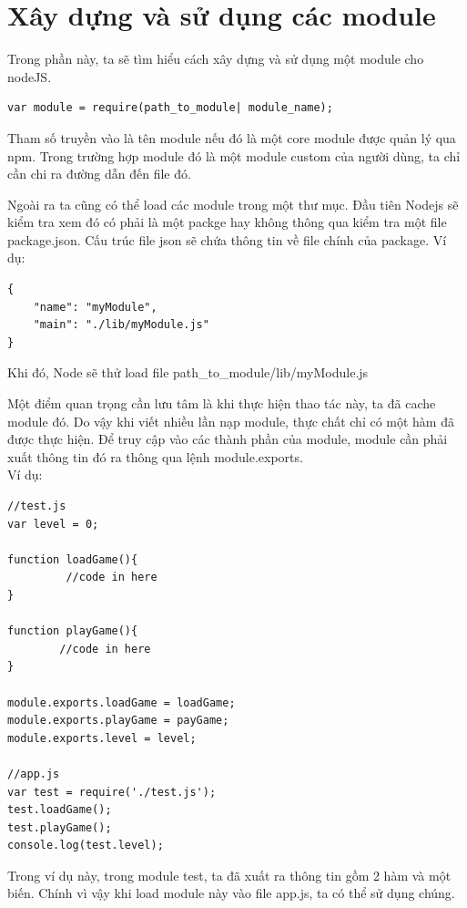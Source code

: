 	\section{Xây dựng và sử dụng các module}
	Trong phần này, ta sẽ tìm hiểu cách xây dựng và sử dụng một module cho nodeJS.

			\begin{verbatim}
var module = require(path_to_module| module_name);
			\end{verbatim}
			
	Tham số truyền vào là tên module nếu đó là một core module được quản lý qua npm. Trong trường hợp module đó là một module custom của người dùng, ta chỉ cần chi ra đường dẫn đến file đó. 

	Ngoài ra ta cũng có thể load các module trong một thư mục. Đầu tiên Nodejs sẽ kiểm tra xem đó có phải là một packge hay không thông qua kiểm tra một file package.json. Cấu trúc file json sẽ chứa thông tin về file chính của package. Ví dụ:
			
			\begin{verbatim}
{
	"name": "myModule",
	"main": "./lib/myModule.js"	
}			
			\end{verbatim}
	
	Khi đó, Node sẽ thử load file path\_to\_module/lib/myModule.js
	
	Một điểm quan trọng cần lưu tâm là khi thực hiện thao tác này, ta đã cache module đó. Do vậy khi viết nhiều lần nạp module, thực chất chỉ có một hàm đã được thực hiện.
	Để truy cập vào các thành phần của module, module cần phải xuất thông tin đó ra thông qua lệnh module.exports.\\
		Ví dụ: 	
		
		\begin{verbatim}
//test.js
var level = 0;

function loadGame(){
         //code in here
}

function playGame(){
        //code in here
}

module.exports.loadGame = loadGame;
module.exports.playGame = payGame;
module.exports.level = level;

//app.js
var test = require('./test.js');
test.loadGame();
test.playGame();
console.log(test.level);
		\end{verbatim}
		
		Trong ví dụ này, trong module test, ta đã xuất ra thông tin gồm 2 hàm và một biến. Chính vì vậy khi load module này vào file app.js, ta có thể sử dụng chúng.
